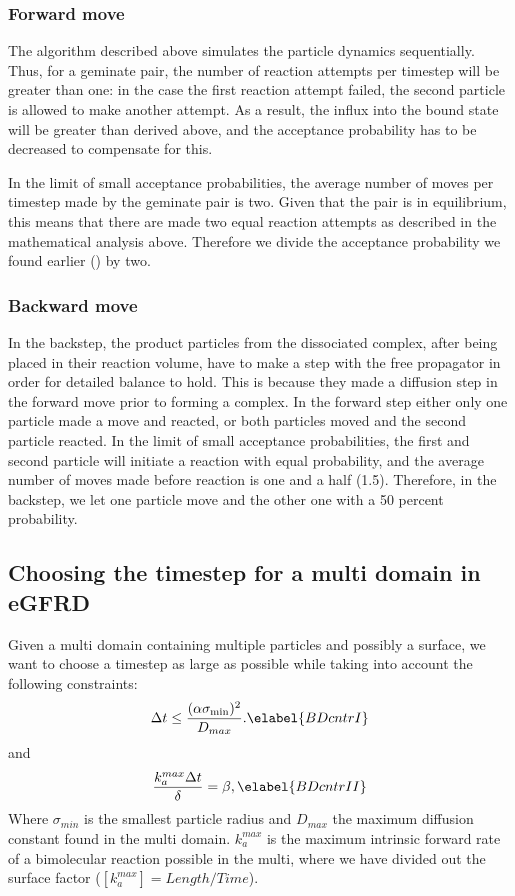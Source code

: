 \subsubsection{Forward move}
The algorithm described above simulates the particle dynamics sequentially. Thus, for a geminate pair, the number of reaction attempts per timestep will be greater than one: in the case the first reaction attempt failed, the second particle is allowed to make another attempt. As a result, the influx into the bound state will be greater than derived above, and the acceptance probability has to be decreased to compensate for this. 

In the limit of small acceptance probabilities, the average number of moves per timestep made by the geminate pair is two. Given that the pair is in equilibrium, this means that there are made two equal reaction attempts as described in the mathematical analysis above. Therefore we divide the acceptance probability we found earlier () by two.

\subsubsection{Backward move}
In the backstep, the product particles from the dissociated complex, after being placed in their reaction volume, have to make a step with the free propagator in order for detailed balance to hold. This is because they made a diffusion step in the forward move prior to forming a complex. In the forward step either only one particle made a move and reacted, or both particles moved and the second particle reacted. In the limit of small acceptance probabilities, the first and second particle will initiate a reaction with equal probability, and the average number of moves made before reaction is one and a half (1.5). Therefore, in the backstep, we let one particle move and the other one with a 50 percent probability.


\subsection{Choosing the timestep for a multi domain in eGFRD}
Given a multi domain containing multiple particles and possibly a surface, we want to choose a timestep as large as possible while taking into account the following constraints:
\begin{equation}
 \Delta t \leq \frac{(\alpha \sigma_{\rm min})^2 }{D_{max}}.
 \elabel{BDcntrI}
\end{equation}
and
\begin{equation}
 \frac{k_{a}^{max} \Delta t}{\delta} = \beta,
 \elabel{BDcntrII}
\end{equation}
Where $\sigma_{min}$ is the smallest particle radius and $D_{max}$ the maximum diffusion constant found in the multi domain. $k_{a}^{max}$ is the maximum intrinsic forward rate of a bimolecular reaction possible in the multi, where we have divided out the surface factor ($[k_{a}^{max}] = Length/Time $).

